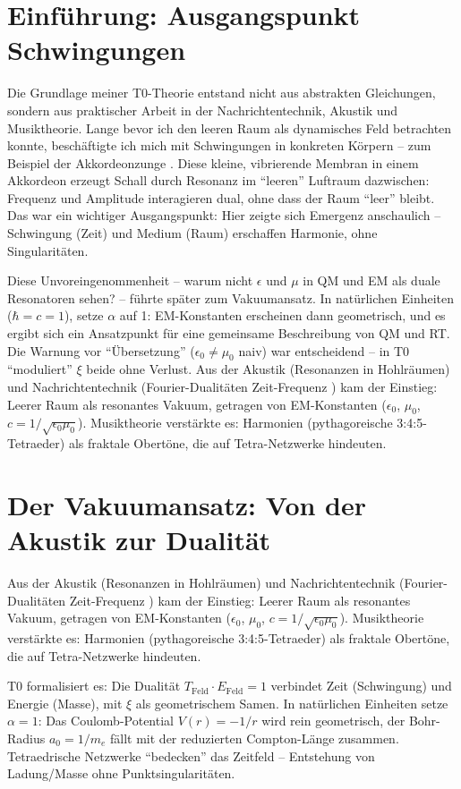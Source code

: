 \section{Einführung: Ausgangspunkt Schwingungen}
	Die Grundlage meiner T0-Theorie entstand nicht aus abstrakten Gleichungen, sondern aus praktischer Arbeit in der Nachrichtentechnik, Akustik und Musiktheorie. Lange bevor ich den leeren Raum als dynamisches Feld betrachten konnte, beschäftigte ich mich mit Schwingungen in konkreten Körpern – zum Beispiel der Akkordeonzunge \cite{ricot2005}. Diese kleine, vibrierende Membran in einem Akkordeon erzeugt Schall durch Resonanz im ``leeren'' Luftraum dazwischen: Frequenz und Amplitude interagieren dual, ohne dass der Raum ``leer'' bleibt. Das war ein wichtiger Ausgangspunkt: Hier zeigte sich Emergenz anschaulich – Schwingung (Zeit) und Medium (Raum) erschaffen Harmonie, ohne Singularitäten.
	
	Diese Unvoreingenommenheit – warum nicht $\epsilon$ und $\mu$ in QM und EM als duale Resonatoren sehen? – führte später zum Vakuumansatz. In natürlichen Einheiten ($\hbar = c = 1$), setze $\alpha$ auf 1: EM-Konstanten erscheinen dann geometrisch, und es ergibt sich ein Ansatzpunkt für eine gemeinsame Beschreibung von QM und RT. Die Warnung vor ``Übersetzung'' ($\epsilon_0 \neq \mu_0$ naiv) war entscheidend – in T0 ``moduliert'' $\xi$ beide ohne Verlust. Aus der Akustik (Resonanzen in Hohlräumen) und Nachrichtentechnik (Fourier-Dualitäten Zeit-Frequenz \cite{stanfordEE261}) kam der Einstieg: Leerer Raum als resonantes Vakuum, getragen von EM-Konstanten ($\epsilon_0$, $\mu_0$, $c = 1/\sqrt{\epsilon_0 \mu_0}$). Musiktheorie verstärkte es: Harmonien (pythagoreische 3:4:5-Tetraeder) als fraktale Obertöne, die auf Tetra-Netzwerke hindeuten.
	
	\section{Der Vakuumansatz: Von der Akustik zur Dualität}
	Aus der Akustik (Resonanzen in Hohlräumen) und Nachrichtentechnik (Fourier-Dualitäten Zeit-Frequenz \cite{stanfordEE261}) kam der Einstieg: Leerer Raum als resonantes Vakuum, getragen von EM-Konstanten ($\epsilon_0$, $\mu_0$, $c = 1/\sqrt{\epsilon_0 \mu_0}$). Musiktheorie verstärkte es: Harmonien (pythagoreische 3:4:5-Tetraeder) als fraktale Obertöne, die auf Tetra-Netzwerke hindeuten.
	
	T0 formalisiert es: Die Dualität $T_{\text{Feld}} \cdot E_{\text{Feld}} = 1$ verbindet Zeit (Schwingung) und Energie (Masse), mit $\xi$ als geometrischem Samen. In natürlichen Einheiten setze $\alpha = 1$: Das Coulomb-Potential $V(r) = -1/r$ wird rein geometrisch, der Bohr-Radius $a_0 = 1/m_e$ fällt mit der reduzierten Compton-Länge zusammen. Tetraedrische Netzwerke ``bedecken'' das Zeitfeld – Entstehung von Ladung/Masse ohne Punktsingularitäten.
	

